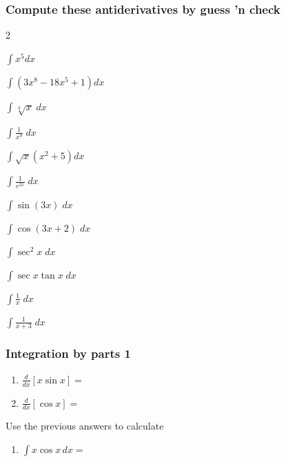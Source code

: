 \documentclass[14pt]{beamer}
\begin{document}
	\begin{frame}[t]
		\fontsize{13}{13}\selectfont
		\frametitle{Compute these antiderivatives by guess 'n check}

		\begin{enumerate}
		\end{enumerate}
	\end{frame}

	\begin{frame}[t]
		\frametitle{Integration by parts 1}

		\begin{enumerate}
			\item $\displaystyle \frac{d}{dx}\left[ x \sin x \right] =$
				\vspace{.1cm}
				\vspace{.1cm}

			\item $\displaystyle \frac{d}{dx}\left[ \cos x \right] =$
				\vspace{.1cm}
				\vspace{.1cm}
		\end{enumerate}
		\vspace{.1cm}
		\vspace{.1cm}
		Use the previous answers to calculate
		\vspace{.1cm}
		\vspace{.1cm}
		\begin{enumerate}
			\addtocounter{enumi}{2}

			\item $\displaystyle \int x \cos x \, dx =$
		\end{enumerate}
	\end{frame}
\end{document}
